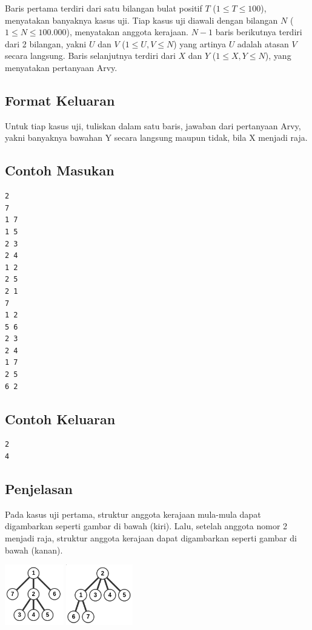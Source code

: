 \documentclass{article}
\begin{document}
Baris pertama terdiri dari satu bilangan bulat positif $T$ ($1 \leq T \leq 100$), menyatakan banyaknya kasus uji.
Tiap kasus uji diawali dengan bilangan $N$ ($1 \leq N \leq 100.000$), menyatakan anggota kerajaan.
$N - 1$ baris berikutnya terdiri dari 2 bilangan, yakni $U$ dan $V$ ($1 \leq U, V \leq N$) yang artinya $U$ adalah atasan $V$ secara langsung.
Baris selanjutnya terdiri dari $X$ dan $Y$ ($1 \leq X, Y \leq N$), yang menyatakan pertanyaan Arvy.

\subsection*{Format Keluaran}

Untuk tiap kasus uji, tuliskan dalam satu baris, jawaban dari pertanyaan Arvy, yakni banyaknya bawahan Y secara langsung maupun tidak, bila X menjadi raja.
\\

\begin{multicols}{2}
\subsection*{Contoh Masukan}
\begin{lstlisting}
2
7
1 7
1 5
2 3
2 4
1 2
2 5
2 1
7
1 2
5 6
2 3
2 4
1 7
2 5
6 2
\end{lstlisting}
\columnbreak
\subsection*{Contoh Keluaran}
\begin{lstlisting}
2
4
\end{lstlisting}
\vfill
\null
\end{multicols}

\pagebreak

\subsection*{Penjelasan}
Pada kasus uji pertama, struktur anggota kerajaan mula-mula dapat digambarkan seperti gambar di bawah (kiri). Lalu, setelah anggota nomor 2 menjadi raja, struktur anggota kerajaan dapat digambarkan seperti gambar di bawah (kanan).

\includegraphics[height=100px]{sample-1-1}
\includegraphics[height=100px]{sample-1-2}
\end{document}
